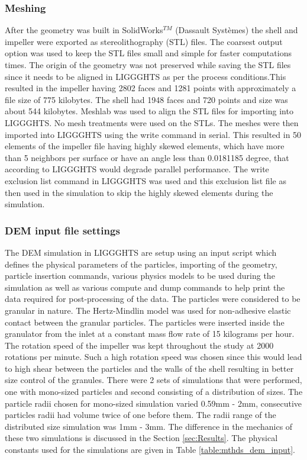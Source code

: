 \documentclass[preprint,11pt,authoryear]{elsarticle}
\begin{document}
\subsubsection{Meshing}
 After the geometry was built in SolidWorks$^{TM}$ (Dassault Syst\`{e}mes) the shell and impeller 
were exported as stereolithography (STL) files. The coarsest output option was used to keep the STL files 
small and simple for faster computations times. The origin of the geometry was not preserved while saving 
the STL files since it needs to be aligned in LIGGGHTS as per the process conditions.This resulted in 
the impeller having 2802 faces and 1281 points with approximately a file size of 775 kilobytes. 
The shell had 1948 faces and 720 points and size was about 544 kilobytes. Meshlab was used to 
align the STL files for importing into LIGGGHTS. No mesh treatments were used on the STLs. 
The meshes were then imported into LIGGGHTS using the write command in serial. This resulted 
in 50 elements of the impeller file having highly skewed elements, which have more than 5 
neighbors per surface or have an angle less than 0.0181185 degree, that according to LIGGGHTS 
would degrade parallel performance. The write exclusion list command in LIGGGHTS was used and 
this exclusion list file as then used in the simulation to skip the highly skewed elements during 
the simulation. 


\subsubsection{DEM input file settings}
The DEM simulation in LIGGGHTS are setup using an input script which defines the physical 
parameters of the particles, importing of the geometry, particle insertion commands, various physics 
models to be used during the simulation as well as various compute and dump commands to help print 
the data required for post-processing of the data. The particles were considered to be granular in 
nature. The Hertz-Mindlin model was used for non-adhesive elastic contact between the granular particles. 
The particles were inserted inside the granulator from the inlet at a constant mass flow rate of 15 
kilograms per hour. The rotation speed of the impeller was kept throughout the study at 2000 rotations 
per minute. Such a high rotation speed was chosen since this would lead to high shear between the 
particles and the walls of the shell resulting in better size control of the granules. There were 2 sets of 
simulations that were performed, one with mono-sized particles and second consisting of a distribution 
of sizes. The particle radii chosen for mono-sized simulation varied 0.59mm - 2mm, consecutive 
particles radii had volume twice of one before them. The radii range of the distributed size simulation 
was 1mm - 3mm. The difference in the mechanics of these two simulations is discussed in the Section \ref{sec:Results}. 
The physical constants used for the simulations are given in Table 
\ref{table:mthds_dem_input}.
\end{document}
